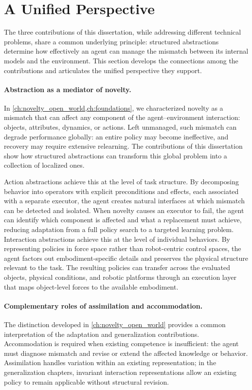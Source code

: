 \section{A Unified Perspective}
\label{sec:unified_perspective}

The three contributions of this dissertation, while addressing different technical problems, share a common underlying principle: structured abstractions determine how effectively an agent can manage the mismatch between its internal models and the environment. This section develops the connections among the contributions and articulates the unified perspective they support.

\paragraph{Abstraction as a mediator of novelty.}
In \cref{ch:novelty_open_world,ch:foundations}, we characterized novelty as a mismatch that can affect any component of the agent--environment interaction: objects, attributes, dynamics, or actions. Left unmanaged, such mismatch can degrade performance globally: an entire policy may become ineffective, and recovery may require extensive relearning. The contributions of this dissertation show how structured abstractions can transform this global problem into a collection of localized ones.

Action abstractions achieve this at the level of task structure. By decomposing behavior into operators with explicit preconditions and effects, each associated with a separate executor, the agent creates natural interfaces at which mismatch can be detected and isolated. When novelty causes an executor to fail, the agent can identify which component is affected and what a replacement must achieve, reducing adaptation from a full policy search to a targeted learning problem. Interaction abstractions achieve this at the level of individual behaviors. By representing policies in force space rather than robot-centric control spaces, the agent factors out embodiment-specific details and preserves the physical structure relevant to the task. The resulting policies can transfer across the evaluated objects, physical conditions, and robotic platforms through an execution layer that maps object-level forces to the available embodiment.

\paragraph{Complementary roles of assimilation and accommodation.}
The distinction developed in \cref{ch:novelty_open_world} provides a common interpretation of the adaptation and generalization contributions. Accommodation is required when existing competence is insufficient: the agent must diagnose mismatch and revise or extend the affected knowledge or behavior. Assimilation handles variation within an existing representation; in the generalization chapters, invariant interaction representations allow an existing policy to remain applicable without structural revision.

